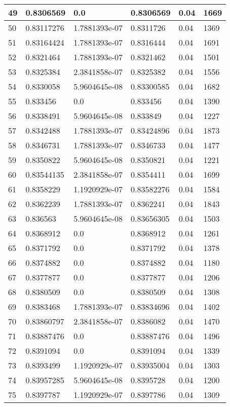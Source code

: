 \begin{longtable}{|l|l|l|l|l|l|}
49 & 0.8306569 & 0.0 & 0.8306569 & 0.04 & 1669 \\ \hline 
50 & 0.83117276 & 1.7881393e-07 & 0.8311726 & 0.04 & 1369 \\ \hline 
51 & 0.83164424 & 1.7881393e-07 & 0.8316444 & 0.04 & 1691 \\ \hline 
52 & 0.8321464 & 1.7881393e-07 & 0.8321462 & 0.04 & 1501 \\ \hline 
53 & 0.8325384 & 2.3841858e-07 & 0.8325382 & 0.04 & 1556 \\ \hline 
54 & 0.8330058 & 5.9604645e-08 & 0.83300585 & 0.04 & 1682 \\ \hline 
55 & 0.833456 & 0.0 & 0.833456 & 0.04 & 1390 \\ \hline 
56 & 0.8338491 & 5.9604645e-08 & 0.833849 & 0.04 & 1227 \\ \hline 
57 & 0.8342488 & 1.7881393e-07 & 0.83424896 & 0.04 & 1873 \\ \hline 
58 & 0.8346731 & 1.7881393e-07 & 0.8346733 & 0.04 & 1477 \\ \hline 
59 & 0.8350822 & 5.9604645e-08 & 0.8350821 & 0.04 & 1221 \\ \hline 
60 & 0.83544135 & 2.3841858e-07 & 0.8354411 & 0.04 & 1699 \\ \hline 
61 & 0.8358229 & 1.1920929e-07 & 0.83582276 & 0.04 & 1584 \\ \hline 
62 & 0.8362239 & 1.7881393e-07 & 0.8362241 & 0.04 & 1843 \\ \hline 
63 & 0.836563 & 5.9604645e-08 & 0.83656305 & 0.04 & 1503 \\ \hline 
64 & 0.8368912 & 0.0 & 0.8368912 & 0.04 & 1261 \\ \hline 
65 & 0.8371792 & 0.0 & 0.8371792 & 0.04 & 1378 \\ \hline 
66 & 0.8374882 & 0.0 & 0.8374882 & 0.04 & 1180 \\ \hline 
67 & 0.8377877 & 0.0 & 0.8377877 & 0.04 & 1206 \\ \hline 
68 & 0.8380509 & 0.0 & 0.8380509 & 0.04 & 1308 \\ \hline 
69 & 0.8383468 & 1.7881393e-07 & 0.83834696 & 0.04 & 1402 \\ \hline 
70 & 0.83860797 & 2.3841858e-07 & 0.8386082 & 0.04 & 1470 \\ \hline 
71 & 0.83887476 & 0.0 & 0.83887476 & 0.04 & 1496 \\ \hline 
72 & 0.8391094 & 0.0 & 0.8391094 & 0.04 & 1339 \\ \hline 
73 & 0.8393499 & 1.1920929e-07 & 0.83935004 & 0.04 & 1303 \\ \hline 
74 & 0.83957285 & 5.9604645e-08 & 0.8395728 & 0.04 & 1200 \\ \hline 
75 & 0.8397787 & 1.1920929e-07 & 0.8397786 & 0.04 & 1309 \\ \hline 
\end{longtable}